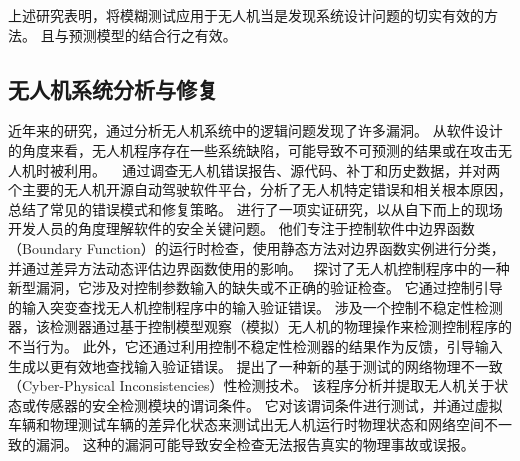 上述研究表明，将模糊测试应用于无人机当是发现系统设计问题的切实有效的方法。
且与预测模型的结合行之有效。




\subsection{无人机系统分析与修复}
近年来的研究，通过分析无人机系统中的逻辑问题发现了许多漏洞。
从软件设计的角度来看，无人机程序存在一些系统缺陷，可能导致不可预测的结果或在攻击无人机时被利用。
~\citet{wang2021exploratory} 通过调查无人机错误报告、源代码、补丁和历史数据，并对两个主要的无人机开源自动驾驶软件平台，分析了无人机特定错误和相关根本原因，总结了常见的错误模式和修复策略。
\citet{liang2021understanding}进行了一项实证研究，以从自下而上的现场开发人员的角度理解软件的安全关键问题。
他们专注于控制软件中边界函数（Boundary Function）的运行时检查，使用静态方法对边界函数实例进行分类，并通过差异方法动态评估边界函数使用的影响。
~\cite{rvfuzzer}探讨了无人机控制程序中的一种新型漏洞，它涉及对控制参数输入的缺失或不正确的验证检查。
它通过控制引导的输入突变查找无人机控制程序中的输入验证错误。
涉及一个控制不稳定性检测器，该检测器通过基于控制模型观察（模拟）无人机的物理操作来检测控制程序的不当行为。 
此外，它还通过利用控制不稳定性检测器的结果作为反馈，引导输入生成以更有效地查找输入验证错误。
\citet{choi2020cyber} 提出了一种新的基于测试的网络物理不一致（Cyber-Physical Inconsistencies）性检测技术。
该程序分析并提取无人机关于状态或传感器的安全检测模块的谓词条件。
它对该谓词条件进行测试，并通过虚拟车辆和物理测试车辆的差异化状态来测试出无人机运行时物理状态和网络空间不一致的漏洞。
这种的漏洞可能导致安全检查无法报告真实的物理事故或误报。

